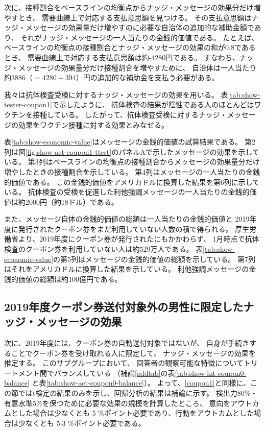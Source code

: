\documentclass[
  11pt,
  a4paper,
]{article}
\begin{document}
次に、接種割合をベースラインの均衡点からナッジ・メッセージの効果分だけ増やすとき、
需要曲線上で対応する支払意思額を見つける。
その支払意思額はナッジ・メッセージの効果量だけ増やすのに必要な自治体の追加的な補助金額であり、
それがナッジ・メッセージの一人当たりの金銭的価値である。
たとえば、ベースラインの均衡点の接種割合とナッジ・メッセージの効果の和が0.8であるとき、
需要曲線上で対応する支払意思額は約-4280円である。
すなわち、ナッジ・メッセージの効果量分だけ接種割合を増やすために、
自治体は一人当たり約3886（\(=4280-394\)）円の追加的な補助金を支払う必要がある。

我々は抗体検査受検に対するナッジ・メッセージの効果を用いる。
表\ref{tab:show-tester-coupon1}で示したように、
抗体検査の結果が陰性である人のほとんどはワクチンを接種している。
したがって、抗体検査受検に対するナッジ・メッセージの効果をワクチン接種に対する効果とみなせる。

表\ref{tab:show-economic-value}はメッセージの金銭的価値の試算結果である。
第2列は図\ref{fig:show-act-coupon1-ttest}のパネルAで示したメッセージの効果を示している。
第3列はベースラインの均衡点の接種割合からメッセージの効果量分だけ増やしたときの接種割合を示している。
第4列はメッセージの一人当たりの金銭的価値である。
この金銭的価値をアメリカドルに換算した結果を第6列に示している。
抗体検査の受検を促進した利他強調メッセージの一人当たりの金銭的価値は約2000円（約18ドル）である。

また、メッセージ自体の金銭的価値の総額は一人当たりの金銭的価値と
2019年度に発行されたクーポン券をまだ利用していない人数の積で得られる。
厚生労働省より、2019年度にクーポン券が発行されたにもかかわらず、
1月時点で抗体検査のクーポン券を利用していない人は約529万人である。
表\ref{tab:show-economic-value}の第5列はメッセージの金銭的価値の総額を示している。
第7列はそれをアメリカドルに換算した結果を示している。
利他強調メッセージの金銭的価値の総額は約100億円である。

\hypertarget{coupon0}{%
\subsection{2019年度クーポン券送付対象外の男性に限定したナッジ・メッセージの効果}\label{coupon0}}

次に、2019年度には、クーポン券の自動送付対象ではないが、
自身が手続きすることでクーポン券を受け取れる人に限定して、
ナッジ・メッセージの効果を推定する。
このサブグループにおいて、
回答者の観察可能な特徴についてトリートメント間でバランスしている
（補論\ref{addtab}の表\ref{tab:show-int-coupon0-balance}
と表\ref{tab:show-act-coupon0-balance}）。
よって、\ref{coupon1}と同様に、この節ではt検定の結果のみを示し、回帰分析の結果は補論に示す。
検出力80\%・有意水準5\%を保つために必要な効果の規模を計算したところ、
意向をアウトカムとした場合は少なくとも
5
\%ポイント必要であり、行動をアウトカムとした場合は少なくとも
5.3
\%ポイント必要である。
\end{document}
